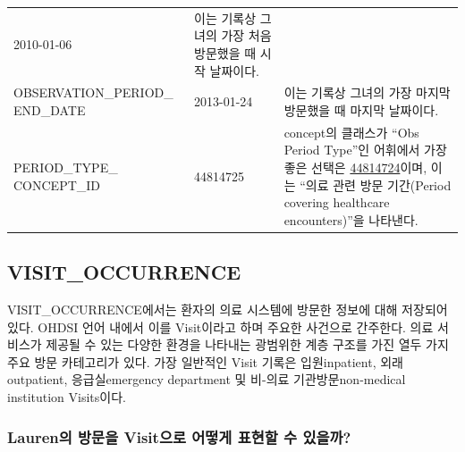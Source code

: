 \documentclass[11pt]{book}
\theoremstyle{definition}
\theoremstyle{definition}
\theoremstyle{definition}
\theoremstyle{remark}
\begin{document}
\begin{longtable}[]{@{}lll@{}}
\begin{minipage}[t]{0.14\columnwidth}
2010-01-06\strut
\end{minipage} & \begin{minipage}[t]{0.48\columnwidth}\raggedright\strut
이는 기록상 그녀의 가장 처음 방문했을 때 시작 날짜이다.\strut
\end{minipage}\tabularnewline
\begin{minipage}[t]{0.29\columnwidth}\raggedright\strut
OBSERVATION\_PERIOD\_ END\_DATE\strut
\end{minipage} & \begin{minipage}[t]{0.14\columnwidth}\raggedright\strut
2013-01-24\strut
\end{minipage} & \begin{minipage}[t]{0.48\columnwidth}\raggedright\strut
이는 기록상 그녀의 가장 마지막 방문했을 때 마지막 날짜이다.\strut
\end{minipage}\tabularnewline
\begin{minipage}[t]{0.29\columnwidth}\raggedright\strut
PERIOD\_TYPE\_ CONCEPT\_ID\strut
\end{minipage} & \begin{minipage}[t]{0.14\columnwidth}\raggedright\strut
44814725\strut
\end{minipage} & \begin{minipage}[t]{0.48\columnwidth}\raggedright\strut
concept의 클래스가 ``Obs Period Type''인 어휘에서 가장 좋은 선택은
\href{http://athena.ohdsi.org/search-terms/terms/44814724}{44814724}이며,
이는 ``의료 관련 방문 기간(Period covering healthcare encounters)''을
나타낸다.\strut
\end{minipage}\tabularnewline
\bottomrule
\end{longtable}

\subsection{VISIT\_OCCURRENCE}\label{visitOccurrence}

VISIT\_OCCURRENCE에서는 환자의 의료 시스템에 방문한 정보에 대해 저장되어
있다. OHDSI 언어 내에서 이를 Visit이라고 하며 주요한 사건으로 간주한다.
의료 서비스가 제공될 수 있는 다양한 환경을 나타내는 광범위한 계층 구조를
가진 열두 가지 주요 방문 카테고리가 있다. 가장 일반적인 Visit 기록은
입원inpatient, 외래outpatient, 응급실emergency department 및 비-의료
기관방문non-medical institution Visits이다.

\subsubsection*{Lauren의 방문을 Visit으로 어떻게 표현할 수
있을까?}\label{lauren--visit----}
\end{document}

